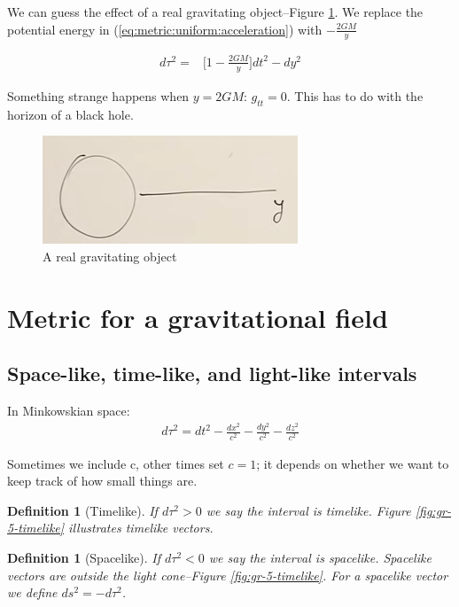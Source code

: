 \documentclass[]{article}
\newtheorem{defn}[thm]{Definition}
\begin{document}
{We can guess the effect of a real gravitating object--Figure \ref{fig:gr-4-gravitating-object}. We replace the potential energy in (\ref{eq:metric:uniform:acceleration}) with $-\frac{2GM}{y}$

\begin{align*}
	d\tau^2 =& \big[1  -\frac{2GM}{y} \big] dt^2 - dy^2
\end{align*}

Something strange happens when $y=2GM$: $g_{tt}=0$. This has to do with the horizon of a black hole.

\begin{figure}[H]
	\caption{A real gravitating object}\label{fig:gr-4-gravitating-object}
	\includegraphics{gr-4-gravitating-object}
\end{figure}



\section{Metric for a gravitational field}

\subsection{Space-like, time-like, and light-like intervals}

In Minkowskian space:
\begin{align*}
	d\tau^2 =dt^2 - \frac{dx^2}{c^2} - \frac{dy^2}{c^2} - \frac{dz^2}{c^2} 
\end{align*}

Sometimes we include c, other times set $c=1$; it depends on whether we want to keep track of how small things are.

\begin{defn}[Timelike]
	If $d\tau^2 >0$ we say the interval is timelike. Figure \ref{fig:gr-5-timelike} illustrates timelike vectors.
\end{defn}

\begin{defn}[Spacelike]
	If $d\tau^2 <0$ we say the interval is spacelike. Spacelike vectors are outside the light cone--Figure \ref{fig:gr-5-timelike}. For a spacelike vector we define $ds^2=-d\tau^2$.
\end{defn}

}
\end{document}
